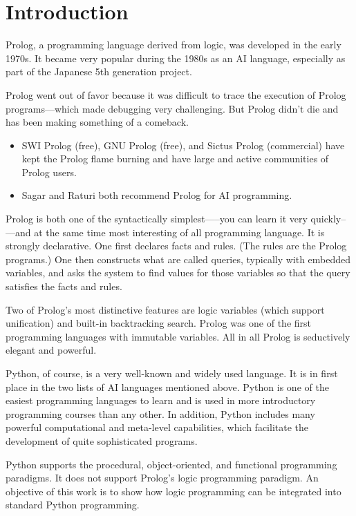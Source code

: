 \section{Introduction}



Prolog, a programming language derived from logic, was developed in the early 1970s. It became very popular during the 1980s as an AI language, especially as part of the Japanese 5th generation project.

Prolog went out of favor because it was difficult to trace the execution of Prolog programs---which made debugging very challenging. But Prolog didn't die and has been making something of a comeback. 
\begin{itemize}
    \item SWI Prolog (free), GNU Prolog (free), and Sictus Prolog (commercial) have kept the Prolog flame burning and have large and active communities of Prolog users.
    \item Sagar \cite{Sagar2019} and Raturi \cite{Raturi2019} both  recommend Prolog for AI programming. 
\end{itemize}
\smallv
Prolog is both one of the syntactically simplest—--you can learn it very quickly--—and at the same time most interesting of all programming language. It is strongly declarative. One first declares facts and rules. (The rules are the Prolog programs.) One then constructs what are called queries, typically with embedded variables, and asks the system to find values for those variables so that the query satisfies the facts and rules. 

Two of Prolog's most distinctive features are logic variables (which support unification) and built-in backtracking search. Prolog was one of the first programming languages with immutable variables. All in all Prolog is seductively elegant and powerful.

Python, of course, is a very well-known and widely used language. It is in first place in the two lists of AI languages mentioned above. Python is one of the easiest programming languages to learn and is used in more introductory programming courses than any other. In addition, Python includes many powerful computational and meta-level capabilities, which facilitate the development of quite sophisticated programs. 
\smallv

Python supports the procedural, object-oriented, and functional programming paradigms. It does not support Prolog's logic programming paradigm. An objective of this work is to show how logic programming can be integrated into standard Python programming.

